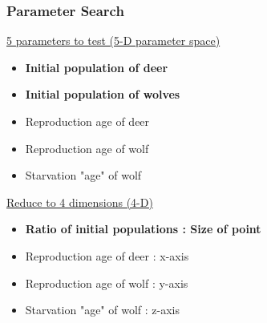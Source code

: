 \documentclass{beamer}
\begin{document}
\frame
{
  \frametitle{Parameter Search}
  \underline{5 parameters to test (5-D parameter space)}
  \begin{itemize}
  \item{\textbf{Initial population of deer}}
  \item{\textbf{Initial population of wolves}}
  \item{Reproduction age of deer}
  \item{Reproduction age of wolf}
  \item{Starvation "age" of wolf}
  \end{itemize} 

  \underline{Reduce to 4 dimensions (4-D)}
  \begin{itemize}
  \item{\textbf{Ratio of initial populations : Size of point}}
  \item{Reproduction age of deer : x-axis}
  \item{Reproduction age of wolf : y-axis}
  \item{Starvation "age" of wolf : z-axis}
  \end{itemize} 

}
\frame
\end{document}
